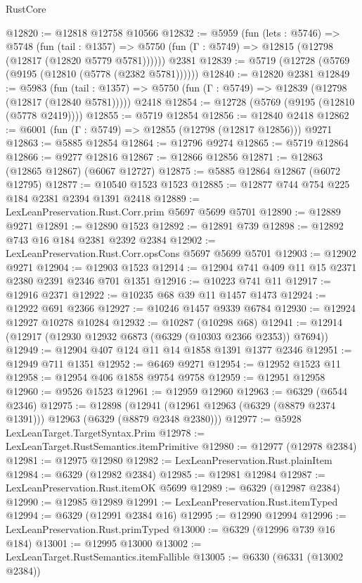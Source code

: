 \begin{lexlean}{RustCore}
\begin{coremodule}
@12820 := @12818 @12758 @10566
@12832 := @5959
    (fun (lets : @5746) =>
    @5748
      (fun (tail : @1357) =>
      @5750 (fun (Γ : @5749) => @12815 (@12798 (@12817 (@12820 @5779 @5781))))))
    @2381
@12839 := @5719 (@12728 (@5769 (@9195 (@12810 (@5778 (@2382 @5781))))))
@12840 := @12820 @2381
@12849 := @5983
    (fun (tail : @1357) => @5750 (fun (Γ : @5749) => @12839 (@12798 (@12817 (@12840 @5781)))))
    @2418
@12854 := @12728 (@5769 (@9195 (@12810 (@5778 @2419))))
@12855 := @5719 @12854
@12856 := @12840 @2418
@12862 := @6001 (fun (Γ : @5749) => @12855 (@12798 (@12817 @12856))) @9271
@12863 := @5885 @12854
@12864 := @12796 @9274
@12865 := @5719 @12864
@12866 := @9277 @12816
@12867 := @12866 @12856
@12871 := @12863 (@12865 @12867) (@6067 @12727)
@12875 := @5885 @12864 @12867 (@6072 @12795)
@12877 := @10540 @1523 @1523
@12885 := @12877 @744 @754 @225 @184 @2381 @2394 @1391 @2418
@12889 := LexLeanPreservation.Rust.Corr.prim @5697 @5699 @5701
@12890 := @12889 @9271
@12891 := @12890 @1523
@12892 := @12891 @739
@12898 := @12892 @743 @16 @184 @2381 @2392 @2384
@12902 := LexLeanPreservation.Rust.Corr.opsCons @5697 @5699 @5701
@12903 := @12902 @9271
@12904 := @12903 @1523
@12914 := @12904 @741 @409 @11 @15 @2371 @2380 @2391 @2346 @701 @1351
@12916 := @10223 @741 @11
@12917 := @12916 @2371
@12922 := @10235 @68 @39 @11 @1457 @1473
@12924 := @12922 @691 @2366
@12927 := @10246 @1457 @9339 @6784
@12930 := @12924 @12927 @10278 @10284
@12932 := @10287 (@10298 @68)
@12941 := @12914 (@12917 (@12930 @12932 @6873 (@6329 (@10303 @2366 @2353)) @7694))
@12949 := @12904 @407 @124 @11 @14 @1858 @1391 @1377 @2346
@12951 := @12949 @711 @1351
@12952 := @6469 @9271
@12954 := @12952 @1523 @11
@12958 := @12954 @406 @1858 @9754 @9758
@12959 := @12951 @12958
@12960 := @9526 @1523
@12961 := @12959 @12960
@12963 := @6329 (@6544 @2346)
@12975 := @12898
    (@12941 (@12961 @12963 (@6329 (@8879 @2374 @1391))) @12963 (@6329 (@8879 @2348 @2380)))
@12977 := @5928 LexLeanTarget.TargetSyntax.Prim
@12978 := LexLeanTarget.RustSemantics.itemPrimitive
@12980 := @12977 (@12978 @2384)
@12981 := @12975 @12980
@12982 := LexLeanPreservation.Rust.plainItem
@12984 := @6329 (@12982 @2384)
@12985 := @12981 @12984
@12987 := LexLeanPreservation.Rust.itemOK @5699
@12989 := @6329 (@12987 @2384)
@12990 := @12985 @12989
@12991 := LexLeanPreservation.Rust.itemTyped
@12994 := @6329 (@12991 @2384 @16)
@12995 := @12990 @12994
@12996 := LexLeanPreservation.Rust.primTyped
@13000 := @6329 (@12996 @739 @16 @184)
@13001 := @12995 @13000
@13002 := LexLeanTarget.RustSemantics.itemFallible
@13005 := @6330 (@6331 (@13002 @2384))

\end{coremodule}
\end{lexlean}
